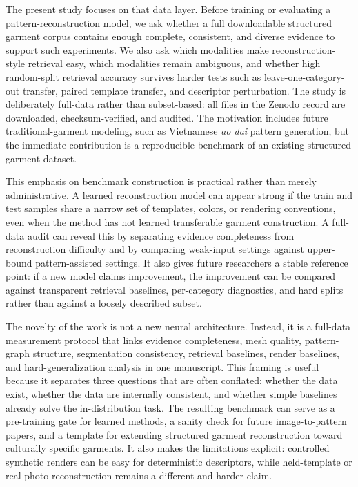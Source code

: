 \documentclass[pdflatex,sn-mathphys-num]{sn-jnl}
\begin{document}
The present study focuses on that data layer. Before training or evaluating a pattern-reconstruction model, we ask whether a full downloadable structured garment corpus contains enough complete, consistent, and diverse evidence to support such experiments. We also ask which modalities make reconstruction-style retrieval easy, which modalities remain ambiguous, and whether high random-split retrieval accuracy survives harder tests such as leave-one-category-out transfer, paired template transfer, and descriptor perturbation. The study is deliberately full-data rather than subset-based: all files in the Zenodo record are downloaded, checksum-verified, and audited. The motivation includes future traditional-garment modeling, such as Vietnamese \textit{ao dai} pattern generation, but the immediate contribution is a reproducible benchmark of an existing structured garment dataset.

This emphasis on benchmark construction is practical rather than merely administrative. A learned reconstruction model can appear strong if the train and test samples share a narrow set of templates, colors, or rendering conventions, even when the method has not learned transferable garment construction. A full-data audit can reveal this by separating evidence completeness from reconstruction difficulty and by comparing weak-input settings against upper-bound pattern-assisted settings. It also gives future researchers a stable reference point: if a new model claims improvement, the improvement can be compared against transparent retrieval baselines, per-category diagnostics, and hard splits rather than against a loosely described subset.

The novelty of the work is not a new neural architecture. Instead, it is a full-data measurement protocol that links evidence completeness, mesh quality, pattern-graph structure, segmentation consistency, retrieval baselines, render baselines, and hard-generalization analysis in one manuscript. This framing is useful because it separates three questions that are often conflated: whether the data exist, whether the data are internally consistent, and whether simple baselines already solve the in-distribution task. The resulting benchmark can serve as a pre-training gate for learned methods, a sanity check for future image-to-pattern papers, and a template for extending structured garment reconstruction toward culturally specific garments. It also makes the limitations explicit: controlled synthetic renders can be easy for deterministic descriptors, while held-template or real-photo reconstruction remains a different and harder claim.
\end{document}
